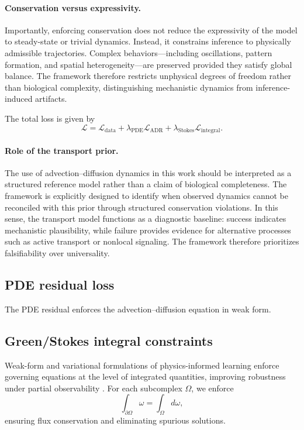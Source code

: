 \documentclass[10pt,article]{article}
\begin{document}
\paragraph{Conservation versus expressivity.}
Importantly, enforcing conservation does not reduce the expressivity of the model to steady-state or trivial dynamics. Instead, it constrains inference to physically admissible trajectories. Complex behaviors—including oscillations, pattern formation, and spatial heterogeneity—are preserved provided they satisfy global balance. The framework therefore restricts unphysical degrees of freedom rather than biological complexity, distinguishing mechanistic dynamics from inference-induced artifacts.

The total loss is given by
\begin{equation}
\mathcal{L} = \mathcal{L}_{\text{data}} + \lambda_{\text{PDE}} \mathcal{L}_{\text{ADR}} + \lambda_{\text{Stokes}} \mathcal{L}_{\text{integral}} .
\end{equation}

\paragraph{Role of the transport prior.}
The use of advection–diffusion dynamics in this work should be interpreted as a structured reference model rather than a claim of biological completeness. The framework is explicitly designed to identify when observed dynamics cannot be reconciled with this prior through structured conservation violations. In this sense, the transport model functions as a diagnostic baseline: success indicates mechanistic plausibility, while failure provides evidence for alternative processes such as active transport or nonlocal signaling. The framework therefore prioritizes falsifiability over universality.
\subsection{PDE residual loss}

The PDE residual enforces the advection--diffusion equation in weak form.

\subsection{Green/Stokes integral constraints}
Weak-form and variational formulations of physics-informed learning enforce governing equations at the level of integrated quantities, improving robustness under partial observability \cite{kharazmi2019vpinnt,wang2023weakform}.
For each subcomplex $\Omega$, we enforce
\begin{equation}
\int_{\partial \Omega} \omega
=
\int_{\Omega} d\omega,
\end{equation}
ensuring flux conservation and eliminating spurious solutions.
\end{document}
